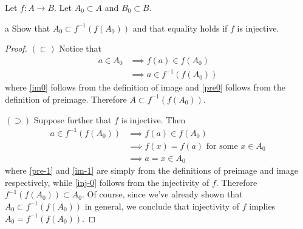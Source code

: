 \documentclass[11pt]{article}
\begin{document}



\begin{ex}{2.1}
  Let $f:A \to B$. Let $A_0 \subset A$ and $B_0 \subset B$.
\end{ex}

\begin{p}{a}
  Show that $A_0 \subset f^{-1}(f(A_0))$ and that equality holds if $f$ is injective.
\end{p}

\begin{proof}
$(\subset)$ Notice that
  \begin{align}
    a \in A_0
      &\implies f(a) \in f(A_0) \label{im0} \\
      &\implies a \in f^{-1}(f(A_0)) \label{pre0}
  \end{align}
  where \eqref{im0} follows from the definition of image and \eqref{pre0}
  follows from the definition of preimage. Therefore $A \subset
  f^{-1}(f(A_0))$.

  $(\supset)$ Suppose further that $f$ is injective. Then
  \begin{align}
    a \in f^{-1}(f(A_0))
      &\implies f(a) \in f(A_0) \label{pre-1} \\
      &\implies f(x) = f(a) \text{ for some } x \in A_0 \label{im-1} \\
      &\implies a = x \in A_0 \label{inj-0}
  \end{align}
  where \eqref{pre-1} and \eqref{im-1} are simply from the definitions of
  preimage and image respectively, while \eqref{inj-0} follows from the
  injectivity of $f$. Therefore $f^{-1}(f(A_0)) \subset A_0$. Of
  course, since we've already shown that $A_0 \subset f^{-1}(f(A_0))$ in
  general, we conclude that injectivity of $f$ implies $A_0 = f^{-1}(f(A_0))$.



\end{proof}
\end{document}

